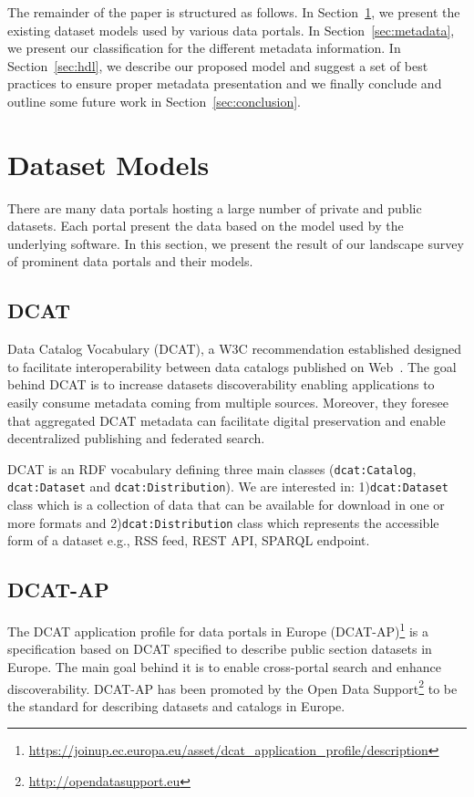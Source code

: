 \documentclass[runningheads,a4paper]{llncs}
\begin{document}
The remainder of the paper is structured as follows. In Section~\ref{sec:models}, we present the existing dataset models used by various data portals. In Section~\ref{sec:metadata}, we present our classification for the different metadata information. In Section~\ref{sec:hdl}, we describe our proposed model and suggest a set of best practices to ensure proper metadata presentation and we finally conclude and outline some future work in Section~\ref{sec:conclusion}.


\section{Dataset Models}
\label{sec:models}

There are many data portals hosting a large number of private and public datasets. Each portal present the data based on the model used by the underlying software. In this section, we present the result of our landscape survey of prominent data portals and their models.

\subsection{DCAT}

Data Catalog Vocabulary (DCAT), a W3C recommendation established designed to facilitate interoperability between data catalogs published on Web~\cite{Erickson:14:DCV}. The goal behind DCAT is to increase datasets discoverability enabling applications to easily consume metadata coming from multiple sources. Moreover, they foresee that aggregated DCAT metadata can facilitate digital preservation and enable decentralized publishing and federated search.

DCAT is an RDF vocabulary defining three main classes (\texttt{dcat:Catalog}, \texttt{dcat:Dataset} and \texttt{dcat:Distribution}). We are interested in: 1)\texttt{dcat:Dataset} class which is a collection of data that can be available for download in one or more formats and 2)\texttt{dcat:Distribution} class which represents the accessible form of a dataset e.g., RSS feed, REST API, SPARQL endpoint.

\subsection{DCAT-AP}

The DCAT application profile for data portals in Europe (DCAT-AP)\footnote{\url{https://joinup.ec.europa.eu/asset/dcat\_application\_profile/description}} is a specification based on DCAT specified to describe public section datasets in Europe. The main goal behind it is to enable cross-portal search and enhance discoverability. DCAT-AP has been promoted by the Open Data Support\footnote{\url{http://opendatasupport.eu}} to be the standard for describing datasets and catalogs in Europe.
\end{document}
